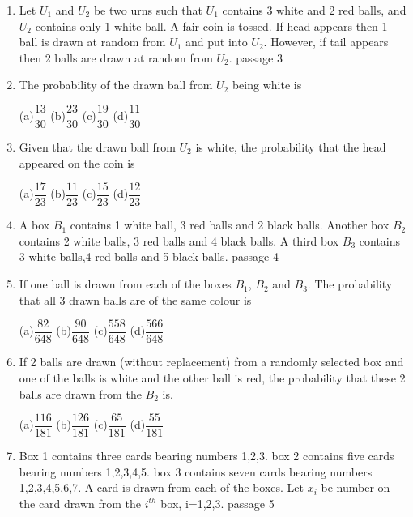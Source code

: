 \documentclass[journal,12pt,twocolumn]{IEEEtran}
\begin{document}
\begin{enumerate}[label=\arabic*]
\begin{multicols}{4}
	(b)$\dfrac{25}{36}$	
	(c)$\dfrac{5}{36}$
	(d)$\dfrac{125}{216}$
	\end{multicols}
	\item Let $U_1$ and $U_2$ be two urns such that $U_1$ contains 3 white and 2 red balls, and $U_2$ contains only 1 white ball. A fair coin is tossed. If head appears then 1 ball is drawn at random from $U_1$ and put into $U_2$. However, if tail appears then 2 balls are drawn at random from $U_2$.   passage 3\\
	\item The probability of the drawn ball from $U_2$ being white is
	\begin{multicols}{4}
	(a)$\dfrac{13}{30}$
	(b)$\dfrac{23}{30}$
	(c)$\dfrac{19}{30}$
	(d)$\dfrac{11}{30}$
	\end{multicols}
	\item Given that the drawn ball from $U_2$ is white, the probability that the head appeared on the coin is
	\begin{multicols}{4}
	(a)$\dfrac{17}{23}$
	(b)$\dfrac{11}{23}$
	(c)$\dfrac{15}{23}$
	(d)$\dfrac{12}{23}$
	\end{multicols}
	\item A box $B_1$ contains 1 white ball, 3 red balls and 2 black balls. Another box $B_2$ contains 2 white balls, 3 red balls and 4 black balls. A third box $B_3$ contains 3 white balls,4 red balls and 5 black balls.   passage 4\\
	\item If one ball is drawn from each of the boxes $B_1$, $B_2$ and $B_3$. The probability that all 3 drawn balls are of the same colour is 
	\begin{multicols}{4}
	(a)$\dfrac{82}{648}$  
	(b)$\dfrac{90}{648}$  
	(c)$\dfrac{558}{648}$
	(d)$\dfrac{566}{648}$
	\end{multicols}
	\item If 2 balls are drawn (without replacement) from a randomly selected box and one of the balls is white and the other ball is red, the probability that these 2 balls are drawn from the $B_2$ is.
	\begin{multicols}{4}
	(a)$\dfrac{116}{181}$   
	(b)$\dfrac{126}{181}$  
	(c)$\dfrac{65}{181}$  
	(d)$\dfrac{55}{181}$
	\end{multicols}
	\item Box 1 contains three cards bearing numbers 1,2,3. box 2 contains five cards bearing numbers 1,2,3,4,5. box 3 contains seven cards bearing numbers 1,2,3,4,5,6,7. A card is drawn from each of the boxes. Let $x_i$ be number on the card drawn from the $i^{th}$ box, i=1,2,3.    passage 5 \\

\end{enumerate}
\end{document}
